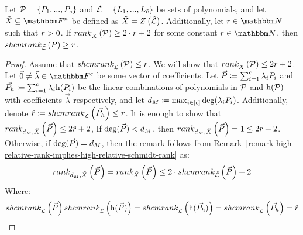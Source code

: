 \begin{remark}
    Let $\genpolyset = \set{\genpoly_1,...,\genpoly_c}$ and $\varpolyset = \set{\varpoly_1,...,\varpoly_{\varietypolycount}}$ be sets of polynomials,
    and let $\variety \subseteq \field$ be defined as $\variety = \zerofunc{\varpolyset}$.
    Additionally, let $\rankval \in \naturalnumbersset$ such that ${{r}} > 0$.
    If $\relrank{\variety}{\genpolyset} \geq 2 \cdot \rankval + 2$ for some constant $\rankval \in \naturalnumbersset$, then $\relschmrank{\varpolyset}{\genpoly} \geq r$.
\end{remark}
\begin{proof}
    Assume that $\relschmrank{\varpolyset}{\genpolyset} \leq \rankval$.
    We will show that $\relrank{\variety}{\genpolyset} \leq 2\rankval + 2$.
    Let $\vec{0} \neq \vec{\lambda} \in \basefield^c$ be some vector of coefficients.
    Let $\vec{\genpoly} \definedas \sum_{i=1}^{c} {\lambda_i \genpoly_i}$ and $\vec{\genpoly_h} \definedas \sum_{i=1}^{c} {\lambda_i \homopart{\genpoly_i}}$
    be the linear combinations of polynomials in $\genpolyset$ and $\homopart{\genpolyset}$ with coefficients $\vec{\lambda}$ respectively,
    and let $\degree_M \definedas \max_{i \in \sparens{c}}{\deg(\lambda_i \genpoly_i)}$.
    Additionally, denote $\hat{\rankval} \definedas \relschmrank{\varpolyset}{\vec{\genpoly_h}} \leq \rankval$.
    It is enough to show that $\drelrank{\degree_M}{\variety}{\vec{\genpoly}} \leq 2 \hat{\rankval} + 2$,
    If $\deg(\vec{\genpoly}) < \degree_M$, then $\drelrank{\degree_M}{\variety}{\vec{\genpoly}} = 1 \leq 2 \rankval + 2$.
    Otherwise, if $\deg(\vec{\genpoly}) = \degree_M$, then the remark follows from Remark~\ref{remark-high-relative-rank-implies-high-relative-schmidt-rank}
    as:
    \[
        \drelrank{\degree_M}{\variety}{\vec{\genpoly}} =
        \relrank{\variety}{\vec{\genpoly}} \leq
        2 \cdot \relschmrank{\varpolyset}{\vec{\genpoly}} + 2
    \]
    Where:
    \[
        \relschmrank{\varpolyset}{\vec{\genpoly}}
        \relschmrank{\varpolyset}{\homopart{\vec{\genpoly}}} =
        \relschmrank{\varpolyset}{\homopart{\vec{\genpoly_h}}} =
        \relschmrank{\varpolyset}{\vec{\genpoly_h}} =
        \hat{\rankval}
    \]
\end{proof}

